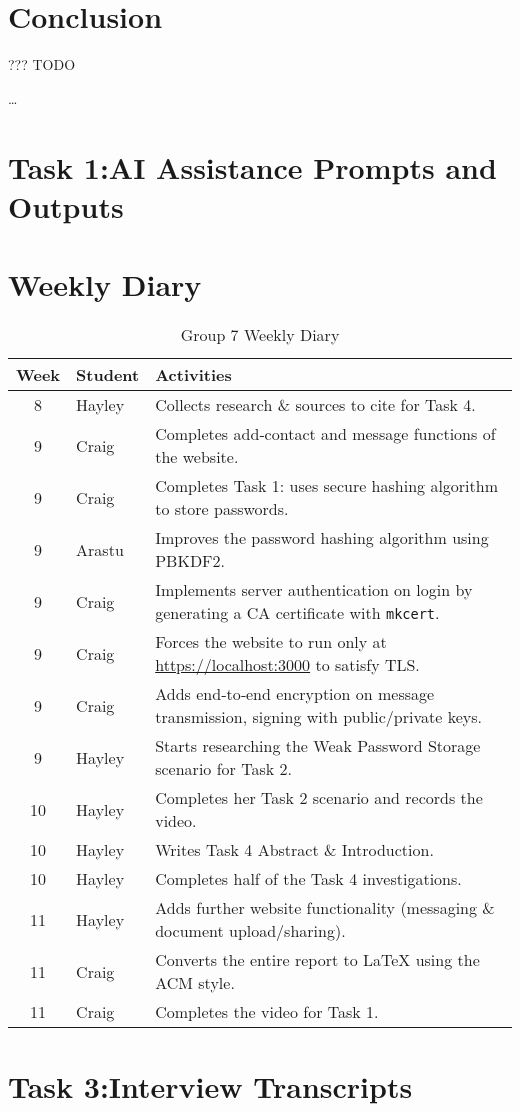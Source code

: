 \documentclass[sigconf]{acmart}
\begin{document}
\section{Conclusion}
\item ??? TODO


…



\newpage
\appendix

\section{Task 1:AI Assistance Prompts and Outputs}



\section{Weekly Diary}

\begin{table}[h]
  \centering
  \small
  \caption{Group 7 Weekly Diary}
  \label{tab:weekly-diary}
  \begin{tabularx}{\linewidth}{c l X}
    \toprule
    \textbf{Week} & \textbf{Student} & \textbf{Activities} \\
    \midrule
    8  & Hayley & Collects research \& sources to cite for Task 4. \\
    9  & Craig  & Completes add‐contact and message functions of the website. \\
    9  & Craig  & Completes Task 1: uses secure hashing algorithm to store passwords. \\
    9  & Arastu & Improves the password hashing algorithm using PBKDF2. \\
    9  & Craig  & Implements server authentication on login by generating a CA certificate with \texttt{mkcert}. \\
    9  & Craig  & Forces the website to run only at \url{https://localhost:3000} to satisfy TLS. \\
    9  & Craig  & Adds end‐to‐end encryption on message transmission, signing with public/private keys. \\
    9  & Hayley & Starts researching the Weak Password Storage scenario for Task 2. \\
    10 & Hayley & Completes her Task 2 scenario and records the video. \\
    10 & Hayley & Writes Task 4 Abstract \& Introduction. \\
    10 & Hayley & Completes half of the Task 4 investigations. \\
    11 & Hayley & Adds further website functionality (messaging \& document upload/sharing). \\
    11 & Craig  & Converts the entire report to LaTeX using the ACM style. \\
    11 & Craig  & Completes the video for Task 1. \\
    \bottomrule
  \end{tabularx}
\end{table}


\section{Task 3:Interview Transcripts}
\end{document}

